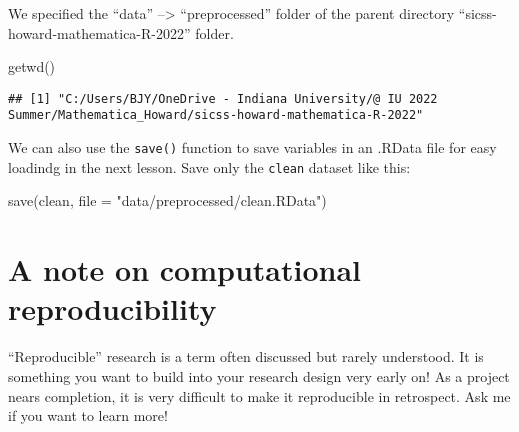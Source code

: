 \documentclass[
]{article}
\newenvironment{Shaded}{\begin{snugshade}}{\end{snugshade}}
\newcommand{\AttributeTok}[1]{\textcolor[rgb]{0.77,0.63,0.00}{#1}}
\newcommand{\FunctionTok}[1]{\textcolor[rgb]{0.00,0.00,0.00}{#1}}
\newcommand{\NormalTok}[1]{#1}
\newcommand{\StringTok}[1]{\textcolor[rgb]{0.31,0.60,0.02}{#1}}
\begin{document}
We specified the ``data'' --\textgreater{} ``preprocessed'' folder of
the parent directory ``sicss-howard-mathematica-R-2022'' folder.

\begin{Shaded}
\begin{Highlighting}[]
\FunctionTok{getwd}\NormalTok{()}
\end{Highlighting}
\end{Shaded}

\begin{verbatim}
## [1] "C:/Users/BJY/OneDrive - Indiana University/@ IU 2022 Summer/Mathematica_Howard/sicss-howard-mathematica-R-2022"
\end{verbatim}

We can also use the \texttt{save()} function to save variables in an
.RData file for easy loadindg in the next lesson. Save only the
\texttt{clean} dataset like this:

\begin{Shaded}
\begin{Highlighting}[]
\FunctionTok{save}\NormalTok{(clean, }\AttributeTok{file =} \StringTok{"data/preprocessed/clean.RData"}\NormalTok{)}
\end{Highlighting}
\end{Shaded}

\hypertarget{a-note-on-computational-reproducibility}{%
\section{A note on computational
reproducibility}\label{a-note-on-computational-reproducibility}}

``Reproducible'' research is a term often discussed but rarely
understood. It is something you want to build into your research design
very early on! As a project nears completion, it is very difficult to
make it reproducible in retrospect. Ask me if you want to learn more!
\end{document}

